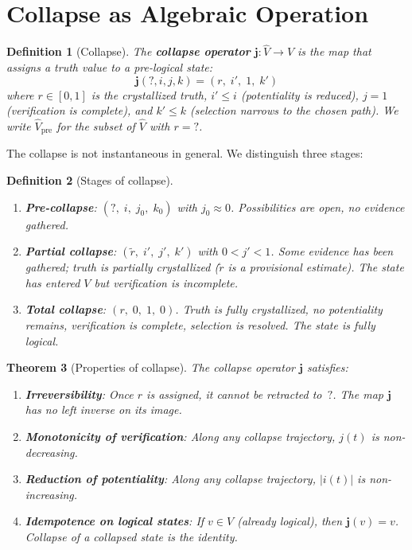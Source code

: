 \documentclass[11pt,a4paper]{article}
\newtheorem{theorem}{Theorem}
\newtheorem{definition}[theorem]{Definition}
\begin{document}
\section{Collapse as Algebraic Operation}
\label{sec:collapse}

\begin{definition}[Collapse]
\label{def:collapse}
The \textbf{collapse operator} $\mathbf{j}: \hat{V} \to V$ is the map
that assigns a truth value to a pre-logical state:
\begin{equation}
\mathbf{j}(?, i, j, k) = (r, \; i', \; 1, \; k')
\end{equation}
where $r \in [0,1]$ is the crystallized truth, $i' \leq i$ (potentiality
is reduced), $j = 1$ (verification is complete), and $k' \leq k$
(selection narrows to the chosen path). We write $\hat{V}_{\mathrm{pre}}$
for the subset of $\hat{V}$ with $r = {?}$.
\end{definition}

The collapse is not instantaneous in general. We distinguish three stages:

\begin{definition}[Stages of collapse]
\label{def:stages}
\leavevmode
\begin{enumerate}[nosep]
\item \textbf{Pre-collapse}: $(?, \; i, \; j_0, \; k_0)$ with $j_0 \approx 0$.
  Possibilities are open, no evidence gathered.
\item \textbf{Partial collapse}: $(\tilde{r}, \; i', \; j', \; k')$ with
  $0 < j' < 1$. Some evidence has been gathered; truth is partially
  crystallized ($\tilde{r}$ is a provisional estimate). The state has
  entered $V$ but verification is incomplete.
\item \textbf{Total collapse}: $(r, \; 0, \; 1, \; 0)$. Truth is fully
  crystallized, no potentiality remains, verification is complete,
  selection is resolved. The state is fully logical.
\end{enumerate}
\end{definition}

\begin{theorem}[Properties of collapse]
\label{thm:collapse-properties}
The collapse operator $\mathbf{j}$ satisfies:
\begin{enumerate}[nosep]
\item \textbf{Irreversibility}: Once $r$ is assigned, it cannot be
  retracted to~$?$. The map $\mathbf{j}$ has no left inverse on its image.
\item \textbf{Monotonicity of verification}: Along any collapse trajectory,
  $j(t)$ is non-decreasing.
\item \textbf{Reduction of potentiality}: Along any collapse trajectory,
  $|i(t)|$ is non-increasing.
\item \textbf{Idempotence on logical states}: If $v \in V$ (already
  logical), then $\mathbf{j}(v) = v$. Collapse of a collapsed state is
  the identity.
\end{enumerate}
\end{theorem}
\end{document}

